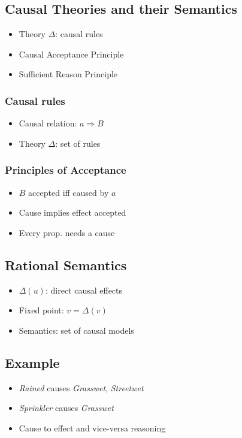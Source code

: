 \documentclass[seminar,palatino,english]{AIGpaper}
\begin{document}
\subsection{Causal Theories and their Semantics}
\begin{itemize}
    \item Theory \(\Delta\): causal rules
    \item Causal Acceptance Principle
    \item Sufficient Reason Principle
\end{itemize}
\subsubsection{Causal rules}
\begin{itemize}
    \item Causal relation: $a \Rightarrow B$
    \item Theory \(\Delta\): set of rules
\end{itemize}
\subsubsection{Principles of Acceptance}
\begin{itemize}
        \item  $B$ accepted iff caused by $a$
    \item  Cause implies effect accepted
    \item  Every prop. needs a cause
\end{itemize}

\subsection{Rational Semantics}
\begin{itemize}
\item \(\Delta(u)\): direct causal effects
    \item Fixed point: $v = \Delta(v)$
    \item Semantics: set of causal models
\end{itemize}

\subsection{Example}
\begin{itemize}
    \item \emph{Rained} causes \emph{Grasswet}, \emph{Streetwet}
    \item \emph{Sprinkler} causes \emph{Grasswet}
    \item Cause to effect and vice-versa reasoning
\end{itemize}
\end{document}
